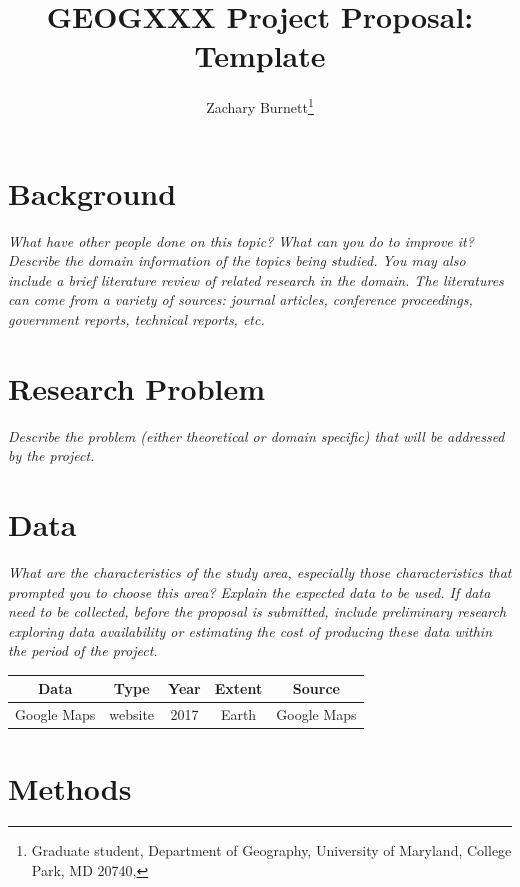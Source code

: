 \documentclass[11pt]{article}
\title{GEOGXXX Project Proposal: Template}
\author{Zachary Burnett\footnote{Graduate student, Department of Geography, University of Maryland, College Park, MD 20740, \email{zrb@umd.edu}}}
\makeatletter
\let\inserttitle\@title
\let\insertauthor\@author
\makeatother
\begin{document}
\begin{center}
  \LARGE{\inserttitle}

  \Large{\insertauthor}
\end{center}

\section{Background}

\textit{What have other people done on this topic? What can you do to improve it? Describe the domain information of the topics being studied. You may also include a brief literature review of related research in the domain. The literatures can come from a  variety of sources: journal articles, conference proceedings, government reports,  technical reports, etc.}

\section{Research Problem}

\textit{Describe the problem (either theoretical or domain specific) that will be addressed by the project.}

\section{Data}

\textit{What are the characteristics of the study area, especially those characteristics that prompted you to choose this area?
Explain the expected data to be used. If data need to be collected, before the proposal is submitted, include preliminary research exploring data availability or estimating the cost of producing these data within the period of the project.}

\begin{center}
  \begin{tabular}{ |c|c|c|c|c| }
  \hline
  \textbf{Data}  &  \textbf{Type}  &  \textbf{Year}  &  \textbf{Extent}  &  \textbf{Source}  \\
  \hline
  Google Maps   &  website  &  2017  &  Earth  &  Google Maps \cite{google_maps}  \\
  \hline
  \end{tabular}
\end{center}

\section{Methods}
\end{document}
